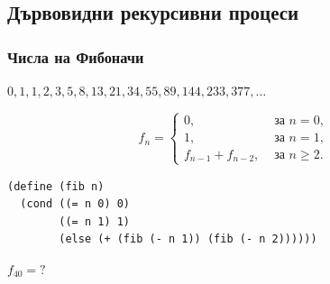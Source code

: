 \documentclass{beamer}
\begin{document}
\subsection{Дървовидни рекурсивни процеси}

\begin{frame}[fragile]
  \frametitle{Числа на Фибоначи}

  $0, 1, 1, 2, 3, 5, 8, 13, 21, 34, 55, 89, 144, 233, 377, \ldots$

  \pause
  \begin{equation*}
    f_n =
    \begin{cases}
      0, &\text{ за }n = 0,\\
      1, &\text{ за }n = 1,\\
      f_{n-1} + f_{n-2}, &\text{ за }n \geq 2.
    \end{cases}
  \end{equation*}

  \pause

\begin{verbatim}
(define (fib n)
  (cond ((= n 0) 0)
        ((= n 1) 1)
        (else (+ (fib (- n 1)) (fib (- n 2))))))
\end{verbatim}

  \pause

  $f_{40} = ?$

\end{frame}
\end{document}
